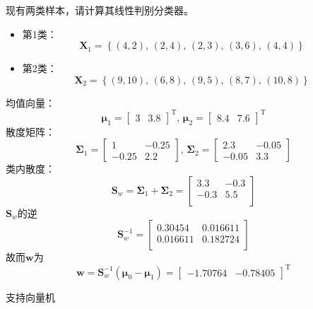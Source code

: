 \begin{example}
    现有两类样本，请计算其线性判别分类器。
    \begin{itemize}
        \item 第1类：
        \[
            \boldsymbol{X}_1 = \left\{ (4,2),\,(2,4),\,(2,3),\,(3,6),\,(4,4) \right\}
        \]
        \item 第2类：
        \[
            \boldsymbol{X}_2 = \left\{ (9,10),\,(6,8),\,(9,5),\,(8,7),\,(10,8) \right\}
        \]
    \end{itemize}
    均值向量：
    \[
        \boldsymbol{\mu}_1 = \begin{bmatrix}
            3 & 3.8
        \end{bmatrix}^{\mathrm{T}},\,\boldsymbol{\mu}_2 = \begin{bmatrix}
            8.4 & 7.6
        \end{bmatrix}^{\mathrm{T}}
    \]
    散度矩阵：
    \[
        \boldsymbol{\Sigma}_1 = \begin{bmatrix}
            1   & -0.25 \\
            -0.25 & 2.2
        \end{bmatrix},\,\boldsymbol{\Sigma}_2 = \begin{bmatrix}
            2.3 & -0.05 \\
            -0.05 & 3.3
        \end{bmatrix}
    \]
    类内散度：
    \[
        \boldsymbol{S}_{w} = \boldsymbol{\Sigma}_1 + \boldsymbol{\Sigma}_2 = \begin{bmatrix}
            3.3 & -0.3 \\
            -0.3 & 5.5 \\
        \end{bmatrix}
    \]
    $\boldsymbol{S}_{w}$的逆
    \[
        \boldsymbol{S}_{w}^{-1} = \begin{bmatrix}
            0.30454 & 0.016611 \\
            0.016611 & 0.182724 \\
        \end{bmatrix}
    \]
    故而$\boldsymbol{w}$为
    \[
        \boldsymbol{w} = \boldsymbol{S}_{w}^{-1}\left( \boldsymbol{\mu}_0-\boldsymbol{\mu}_1 \right) = \begin{bmatrix}   
            -1.70764 & -0.78405
        \end{bmatrix}^{\mathrm{T}}
    \]
\end{example}

\textcolor{main1}{支持向量机}

